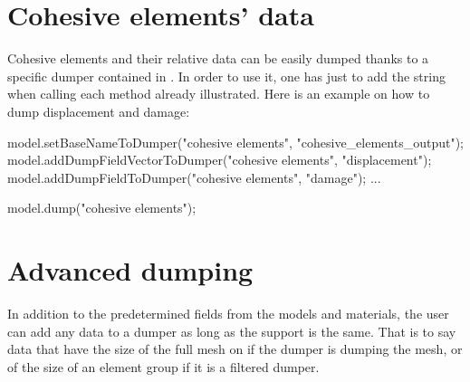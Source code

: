 \section{Cohesive elements' data}
Cohesive elements and their relative data can be easily dumped thanks
to a specific dumper contained in
. In order to use it, one has just
to add the string  when calling each method
already illustrated. Here is an example on how to dump displacement
and damage:
\begin{cpp}
  model.setBaseNameToDumper("cohesive elements", "cohesive_elements_output");
  model.addDumpFieldVectorToDumper("cohesive elements", "displacement");
  model.addDumpFieldToDumper("cohesive elements", "damage");
  ...

  model.dump("cohesive elements");
\end{cpp}


\section{Advanced dumping}

In addition to the predetermined fields from the models and materials, the user
can add any data to a dumper as long as the support is the same. That is to say
data that have the size of the full mesh on if the dumper is dumping the mesh,
or of the size of an element group if it is a filtered dumper.




